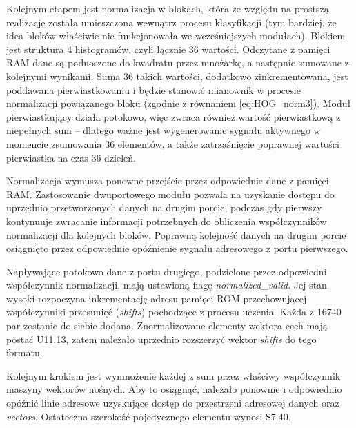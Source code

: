 Kolejnym etapem jest normalizacja w blokach, która ze względu na prostszą realizację została umieszczona wewnątrz procesu klasyfikacji (tym bardziej, że idea bloków właściwie nie funkcjonowała we wcześniejszych modułach). %
Blokiem jest struktura 4 histogramów, czyli łącznie 36 wartości. 
Odczytane z pamięci RAM dane są podnoszone do kwadratu przez mnożarkę, a następnie sumowane z kolejnymi wynikami. %
Suma 36 takich wartości, dodatkowo zinkrementowana, jest poddawana pierwiastkowaniu i będzie stanowić mianownik w procesie normalizacji powiązanego bloku (zgodnie z równaniem \eqref{eq:HOG_norm3}). 
Moduł pierwiastkujący działa potokowo, więc zwraca również wartość pierwiastkową z niepełnych sum -- dlatego ważne jest wygenerowanie sygnału aktywnego w momencie zsumowania 36 elementów, a także zatrzaśnięcie poprawnej wartości pierwiastka na czas 36 dzieleń.

Normalizacja wymusza ponowne przejście przez odpowiednie dane z pamięci RAM. 
Zastosowanie dwuportowego modułu pozwala na uzyskanie dostępu do uprzednio przetworzonych danych na drugim porcie, podczas gdy pierwszy kontynuuje zwracanie informacji potrzebnych do obliczenia współczynników normalizacji dla kolejnych bloków. %
Poprawną kolejność danych na drugim porcie osiągnięto przez odpowiednie opóźnienie sygnału adresowego z portu pierwszego. 

Napływające potokowo dane z portu drugiego, podzielone przez odpowiedni współczynnik normalizacji, mają ustawioną flagę \textit{normalized\_valid}.
Jej stan wysoki rozpoczyna inkrementację adresu pamięci ROM przechowującej współczynniki przesunięć (\textit{shifts}) pochodzące z procesu uczenia. %
Każda z 16740 par zostanie do siebie dodana. 
Znormalizowane elementy wektora cech mają postać U11.13, zatem należało uprzednio rozszerzyć wektor \textit{shifts} do tego formatu. 

Kolejnym krokiem jest wymnożenie każdej z sum przez właściwy współczynnik maszyny wektorów nośnych. %
Aby to osiągnąć, należało ponownie i odpowiednio opóźnić linie adresowe uzyskujące dostęp do przestrzeni adresowej danych oraz \textit{vectors}. 
Ostateczna szerokość pojedycznego elementu wynosi S7.40.

